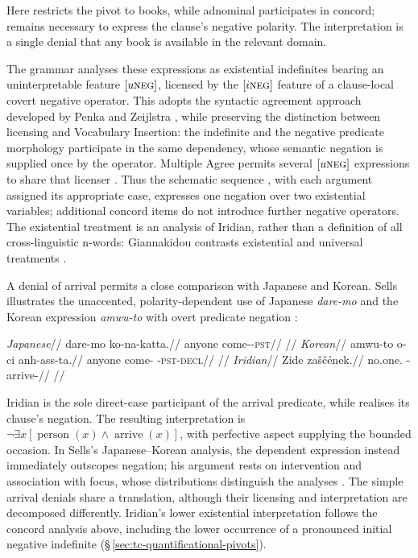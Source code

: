 Here  restricts the pivot to books, while adnominal 
participates in concord;  remains necessary to express the
clause's negative polarity. The interpretation is a single
denial that any book is available in the relevant domain.

The grammar analyses these expressions as existential indefinites bearing
an uninterpretable feature $[u\textsc{neg}]$, licensed by the $[i\textsc{neg}]$ feature of a
clause-local covert negative operator. This adopts the syntactic agreement
approach developed by Penka and Zeijlstra \cite{penka2011,zeijlstra2022}, while preserving the
distinction between licensing and Vocabulary Insertion: the indefinite and
the negative predicate morphology participate in the same dependency, whose
semantic negation is supplied once by the operator. Multiple Agree permits
several $[u\textsc{neg}]$ expressions to share that licenser \cite{penka2012}. Thus the schematic sequence
, with each argument assigned its
appropriate case, expresses one negation over two existential variables;
additional concord items do not introduce further negative operators. The
existential treatment is an analysis of Iridian, rather than a definition of
all cross-linguistic n-words: Giannakidou contrasts
existential and universal treatments \cite{giannakidou2006}.

A denial of arrival permits a close comparison with Japanese and Korean.
Sells illustrates the unaccented, polarity-dependent use of Japanese
\textit{dare-mo} and the Korean expression \textit{amwu-to} with overt
predicate negation \cite[p.~52, examples~1a--b]{sells2022}:

\pex\label{ex:concord-comparative-arrival}
\a
\begingl
\glpreamble \textit{Japanese}//
\gla dare-mo ko-na-katta.//
\glb anyone come-\Neg{}-\textsc{pst}//
\glft {}//
\endgl
\a
\begingl
\glpreamble \textit{Korean}//
\gla amwu-to o-ci anh-ass-ta.//
\glb anyone come-\Compl{} \Neg{}-\textsc{pst}-\textsc{decl}//
\glft {}//
\endgl
\a
\begingl
\glpreamble \textit{Iridian}//
\gla Zide zaščének.//
\glb no.one.\Dir{} \Neg{}-arrive-\Pf{}//
\glft {}
//
\endgl
\xe

Iridian  is the sole direct-case participant of the arrival
predicate, while  realises its clause's negation. The resulting
interpretation is $\neg\exists x[\operatorname{person}(x)\land
\operatorname{arrive}(x)]$, with perfective aspect supplying the bounded
occasion. In Sells's Japanese--Korean analysis, the dependent expression
instead immediately outscopes negation; his argument rests on intervention
and association with focus, whose distributions distinguish the analyses
\cite[pp.~53--55, §2]{sells2022}. The simple arrival denials share a
translation, although their licensing and interpretation are decomposed
differently. Iridian's lower existential interpretation follows the concord
analysis above, including the lower occurrence of a pronounced initial
negative indefinite (§\,\ref{sec:tc-quantificational-pivots}).

